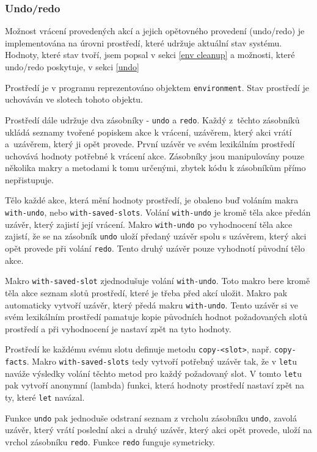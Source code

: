 \subsubsection{Undo/redo}
Možnost vrácení provedených akcí a jejich opětovného provedení (undo/redo) je
implementována na úrovni prostředí, které udržuje aktuální stav systému.
Hodnoty, které stav tvoří, jsem popsal v sekci \ref{env cleanup} a možnosti,
které undo/redo poskytuje, v sekci \ref{undo}

Prostředí je v programu reprezentováno objektem \verb|environment|. Stav
prostředí je uchováván ve slotech tohoto objektu.

Prostředí dále udržuje dva zásobníky - \verb|undo| a \verb|redo|.
Každý z~těchto zásobníků ukládá seznamy tvořené popiskem akce k vrácení,
uzávěrem, který akci vrátí a~uzávěrem, který ji opět provede. První uzávěr ve
svém lexikálním prostředí uchovává hodnoty potřebné k vrácení akce. Zásobníky
jsou manipulovány pouze několika makry a metodami k tomu určenými, zbytek kódu k
zásobníkům přímo nepřistupuje.

Tělo každé akce, která mění hodnoty prostředí, je obaleno buď voláním makra
\verb|with-undo|, nebo \verb|with-saved-slots|. Volání \verb|with-undo| je kromě
těla akce předán uzávěr, který zajistí její vrácení. Makro \verb|with-undo|
po vyhodnocení těla akce zajistí, že se na zásobník \verb|undo| uloží předaný
uzávěr spolu s uzávěrem, který akci opět provede při volání \verb|redo|.
Tento druhý uzávěr pouze vyhodnotí původní tělo akce.

Makro \verb|with-saved-slot| zjednodušuje volání \verb|with-undo|. Toto makro
bere kromě těla akce seznam slotů prostředí, které je třeba před akcí uložit.
Makro pak automaticky vytvoří uzávěr, který předá makru \verb|with-undo|. Tento
uzávěr si ve svém lexikálním prostředí pamatuje kopie původních hodnot požadovaných
slotů prostředí a při vyhodnocení je nastaví zpět na tyto hodnoty.

Prostředí ke každému svému slotu definuje metodu \verb|copy-<slot>|, např.
\verb|copy-facts|. Makro \verb|with-saved-slots| tedy vytvoří potřebný uzávěr
tak, že v \verb|let|u naváže výsledky volání těchto metod pro každý požadovaný
slot. V tomto \verb|let|u pak vytvoří anonymní (lambda) funkci, která hodnoty
prostředí nastaví zpět na ty, které \verb|let| navázal.

Funkce \verb|undo| pak jednoduše odstraní seznam z vrcholu zásobníku
\verb|undo|, zavolá uzávěr, který vrátí poslední akci a druhý uzávěr, který akci
opět provede, uloží na vrchol zásobníku \verb|redo|. Funkce \verb|redo| funguje
symetricky.

